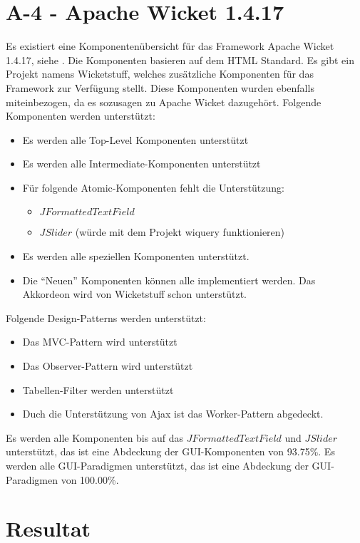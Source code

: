 \section{A-4 - Apache Wicket 1.4.17}

Es existiert eine Komponentenübersicht für das Framework Apache Wicket 1.4.17,
siehe \cite{WicketComponents}. Die Komponenten basieren auf dem \ac{HTML}
Standard. Es gibt ein Projekt namens Wicketstuff, welches zusätzliche
Komponenten für das Framework zur Verfügung stellt. Diese Komponenten wurden
ebenfalls miteinbezogen, da es sozusagen zu Apache Wicket dazugehört. Folgende
Komponenten werden unterstützt:

\begin{itemize}
  \item Es werden alle Top-Level Komponenten unterstützt
  \item Es werden alle Intermediate-Komponenten unterstützt
  \item Für folgende Atomic-Komponenten fehlt die Unterstützung:
  \begin{itemize}
    \item \(JFormattedTextField\)
    \item \(JSlider\) (würde mit dem Projekt wiquery funktionieren)
  \end{itemize}
  \item Es werden alle speziellen Komponenten unterstützt.
  \item Die ``Neuen'' Komponenten können alle implementiert werden. Das
  Akkordeon wird von Wicketstuff schon unterstützt.
\end{itemize}

Folgende Design-Patterns werden unterstützt:

\begin{itemize}
  \item Das MVC-Pattern wird unterstützt
  \item Das Observer-Pattern wird unterstützt
  \item Tabellen-Filter werden unterstützt
  \item Duch die Unterstützung von Ajax ist das Worker-Pattern abgedeckt.
\end{itemize}

Es werden alle Komponenten bis auf das \(JFormattedTextField\) und
\(JSlider\) unterstützt, das ist eine Abdeckung der GUI-Komponenten von 93.75\%.
Es werden alle GUI-Paradigmen unterstützt, das ist eine Abdeckung der
GUI-Paradigmen von 100.00\%.

\section{Resultat}

